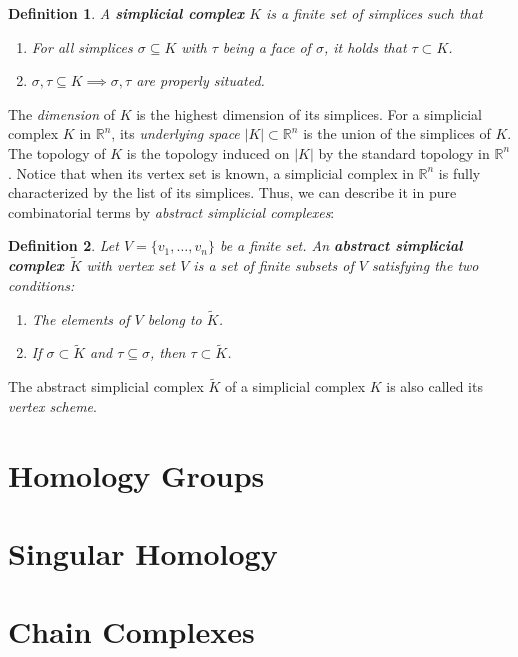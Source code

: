 \documentclass{article}
\newtheorem*{definition}{Definition}
\begin{document}
\begin{definition}
A \textbf{simplicial complex} $K$ is a finite set of simplices such that
\begin{enumerate}
	\item For all simplices $\sigma \subseteq K$ with $\tau$ being a face of $\sigma$, it holds that $\tau \subset K$.
	\item $\sigma, \tau \subseteq K \implies \sigma, \tau$ are properly situated.
\end{enumerate}
\end{definition}

The \emph{dimension} of $K$ is the highest dimension of its simplices. For a simplicial complex $K$ in $\mathbb{R}^n$, its \emph{underlying space} $\vert K \vert \subset \mathbb{R}^n$ is the union of the simplices of $K$. The topology of $K$ is the topology induced on $\vert K \vert$ by the standard topology in $\mathbb{R}^n$. Notice that when its vertex set is known, a simplicial complex in $\mathbb{R}^n$ is fully characterized by the list of its simplices. Thus, we can describe it in pure combinatorial terms by \emph{abstract simplicial complexes}:

\begin{definition}
Let $V = \{v_1, \ldots, v_n\}$ be a finite set. An \textbf{abstract simplicial complex $\tilde{K}$} with vertex set $V$ is a set of finite subsets of $V$ satisfying the two conditions:
\begin{enumerate}
	\item The elements of $V$ belong to $\tilde{K}$.
	\item If $\sigma \subset \tilde{K}$ and $\tau \subseteq \sigma$, then $\tau \subset \tilde{K}$.
\end{enumerate}
\end{definition}

The abstract simplicial complex $\tilde{K}$ of a simplicial complex $K$ is also called its \emph{vertex scheme}. 

\section{Homology Groups}
\section{Singular Homology}
\section{Chain Complexes}
\end{document}
